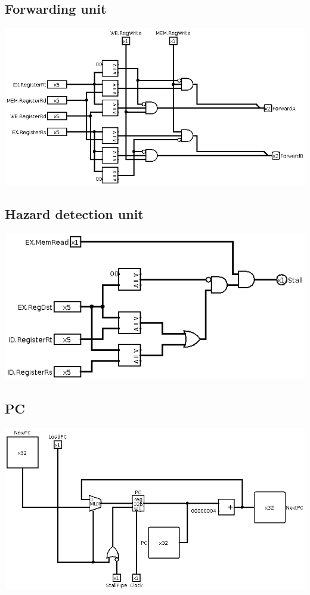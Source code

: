 \subsection{Forwarding unit}
\includegraphics[width=\textwidth]{billeder/Forwarding_unit.png}

\subsection{Hazard detection unit}
\includegraphics[width=\textwidth]{billeder/Hazard_detection_unit.png}

\subsection{PC}
\includegraphics[width=\textwidth]{billeder/PC.png}

